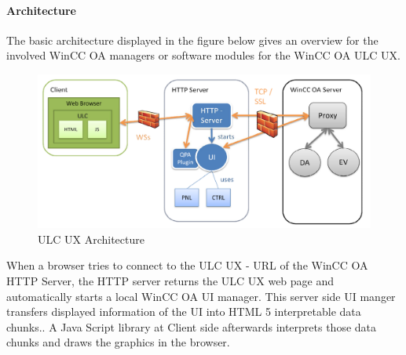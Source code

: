 \documentclass[a4paper, 12pt]{article}
\begin{document}
\paragraph{Architecture}
The basic architecture displayed in the figure below gives an overview for the involved WinCC OA managers or software modules for the WinCC OA ULC UX.
\begin{figure}[!ht]
    \centering
    \includegraphics[scale = 0.4]{images/ulc_ux_architecture.png}
    \caption{ULC UX Architecture}
\end{figure}\newline
When a browser tries to connect to the ULC UX - URL of the WinCC OA HTTP Server, the HTTP server returns the ULC UX web page and automatically starts a local WinCC OA UI manager. This server side UI manger transfers displayed information of the UI into HTML 5 interpretable data chunks.. A Java Script library at Client side afterwards interprets those data chunks and draws the graphics in the browser.

\clearpage
\glsaddall
\printglossaries
\end{document}
